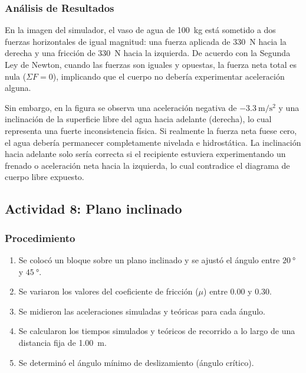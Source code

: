 \documentclass[11pt,a4paper]{article}
\begin{document}
\subsubsection{Análisis de Resultados}
En la imagen del simulador, el vaso de agua de \SI{100}{\kilogram} está sometido a dos fuerzas horizontales de igual magnitud: una fuerza aplicada de \SI{330}{\newton} hacia la derecha y una fricción de \SI{330}{\newton} hacia la izquierda. De acuerdo con la Segunda Ley de Newton, cuando las fuerzas son iguales y opuestas, la fuerza neta total es nula ($\Sigma F = 0$), implicando que el cuerpo no debería experimentar aceleración alguna.

Sin embargo, en la figura se observa una aceleración negativa de $\SI{-3.3}{\meter\per\second\squared}$ y una inclinación de la superficie libre del agua hacia adelante (derecha), lo cual representa una fuerte inconsistencia física. Si realmente la fuerza neta fuese cero, el agua debería permanecer completamente nivelada e hidrostática. La inclinación hacia adelante solo sería correcta si el recipiente estuviera experimentando un frenado o aceleración neta hacia la izquierda, lo cual contradice el diagrama de cuerpo libre expuesto.

\subsection{Actividad 8: Plano inclinado}
\subsubsection{Procedimiento}
\begin{enumerate}
    \item Se colocó un bloque sobre un plano inclinado y se ajustó el ángulo entre $\SI{20}{\degree}$ y $\SI{45}{\degree}$.
    \item Se variaron los valores del coeficiente de fricción ($\mu$) entre 0.00 y 0.30.
    \item Se midieron las aceleraciones simuladas y teóricas para cada ángulo.
    \item Se calcularon los tiempos simulados y teóricos de recorrido a lo largo de una distancia fija de \SI{1.00}{\meter}.
    \item Se determinó el ángulo mínimo de deslizamiento (ángulo crítico).
\end{enumerate}
\end{document}
